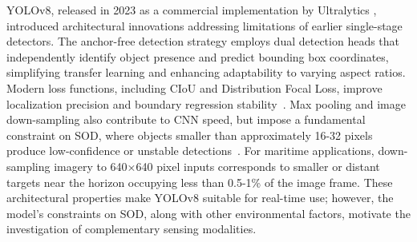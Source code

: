 \documentclass{erauthesis}
\begin{document}
YOLOv8, released in 2023 as a commercial implementation by Ultralytics \cite{ultralytics}, introduced architectural innovations addressing limitations of earlier single-stage detectors.
The anchor-free detection strategy employs dual detection heads that independently identify object presence and predict bounding box coordinates, simplifying transfer learning and enhancing adaptability to varying aspect ratios.
Modern loss functions, including \ac{CIoU} and Distribution Focal Loss, improve localization precision and boundary regression stability~\cite{redmon2016}.
Max pooling and image down-sampling also contribute to CNN speed, but impose a fundamental constraint on \ac{SOD}, where objects smaller than approximately 16-32 pixels produce low-confidence or unstable detections~\cite{rekavandi2022}.
For maritime applications, down-sampling imagery to 640×640 pixel inputs corresponds to smaller or distant targets near the horizon occupying less than 0.5-1\% of the image frame.
These architectural properties make YOLOv8 suitable for real-time use; however, the model's constraints on \ac{SOD}, along with other environmental factors, motivate the investigation of complementary sensing modalities.


\end{document}

